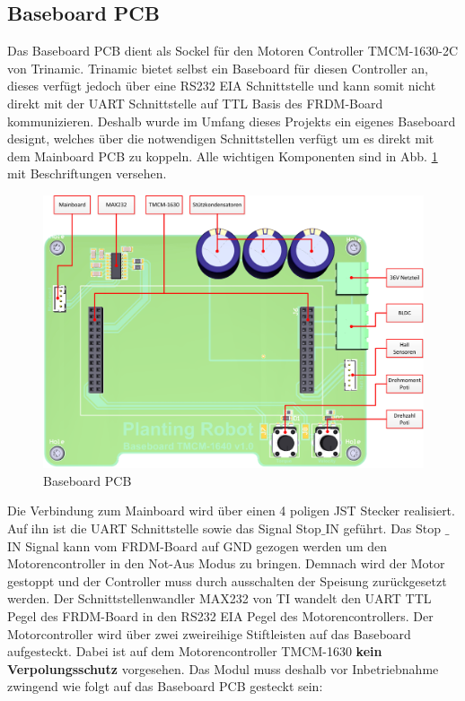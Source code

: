 \subsection{Baseboard PCB}
Das Baseboard PCB dient als Sockel für den Motoren Controller TMCM-1630-2C von Trinamic. Trinamic bietet selbst ein Baseboard für diesen Controller an, dieses verfügt jedoch über eine RS232 EIA Schnittstelle und kann somit nicht direkt mit der UART Schnittstelle auf TTL Basis des FRDM-Board kommunizieren. Deshalb wurde im Umfang dieses Projekts ein eigenes Baseboard designt, welches über die notwendigen Schnittstellen verfügt um es direkt mit dem Mainboard PCB zu koppeln. Alle wichtigen Komponenten sind in Abb. \ref{fig:Baseboard_3D} mit Beschriftungen versehen.

\begin{figure}[H]
	\includegraphics[width=1\textwidth]{Illustrationen/6-Umsetzung/Baseboard_3D_TOP.jpg}
	\caption{Baseboard PCB}
	\label{fig:Baseboard_3D}
\end{figure}

Die Verbindung zum Mainboard wird über einen 4 poligen JST Stecker realisiert. Auf ihn ist die UART Schnittstelle sowie das Signal Stop$\_$IN geführt. Das Stop $\_$IN Signal kann vom FRDM-Board auf GND gezogen werden um den Motorencontroller in den Not-Aus Modus zu bringen. Demnach wird der Motor gestoppt und der Controller muss durch ausschalten der Speisung zurückgesetzt werden. Der Schnittstellenwandler MAX232 von TI wandelt den UART TTL Pegel des FRDM-Board in den RS232 EIA Pegel des Motorencontrollers. Der Motorcontroller wird über zwei zweireihige Stiftleisten auf das Baseboard aufgesteckt. Dabei ist auf dem Motorencontroller TMCM-1630 \textbf{kein Verpolungsschutz} vorgesehen. Das Modul muss deshalb vor Inbetriebnahme zwingend wie folgt auf das Baseboard PCB gesteckt sein:

